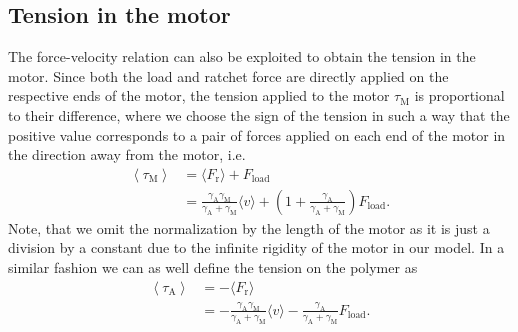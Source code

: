 \documentclass[aps,pre,twocolumn,showpacs,showkeys,superscriptaddress,floatfix]{revtex4-1}
\begin{document}
\subsection{Tension in the motor}
The force-velocity relation can also be exploited to obtain the tension in the motor. 
Since both the load and ratchet force are directly applied on the respective ends of the motor, 
the tension applied to the motor $\tau_\text{M}$ is proportional to their difference,
where we choose the sign of the tension in such a way 
that the positive value corresponds to a pair of forces applied on each end of the motor in the direction away from the motor,
i.e.  
\begin{align}
\left\langle \tau_\text{M} \right\rangle 
&= \langle F_\text{r} \rangle + F_\text{load} \nonumber \\
&= \frac{\gamma_\text{A}\gamma_\text{M}}{\gamma_\text{A}+\gamma_\text{M}}\langle v\rangle 
+ \left(1 + \frac{\gamma_\text{A}}{\gamma_\text{A}+\gamma_\text{M}} \right) F_\text{load}.
\label{eq:tension}
\end{align}
Note, that we omit the normalization by the length of the motor as it is just a division by a constant due to the infinite rigidity of the motor in our model.   
In a similar fashion we can as well define the tension on the polymer as
\begin{align}
\left\langle \tau_\text{A} \right\rangle 
&= - \langle F_\text{r} \rangle \nonumber \\
&= - \frac{\gamma_\text{A}\gamma_\text{M}}{\gamma_\text{A}+\gamma_\text{M}}\langle v\rangle 
- \frac{\gamma_\text{A}}{\gamma_\text{A}+\gamma_\text{M}} F_\text{load}.
\label{eq:tension_on_polymer}
\end{align}
\end{document}
